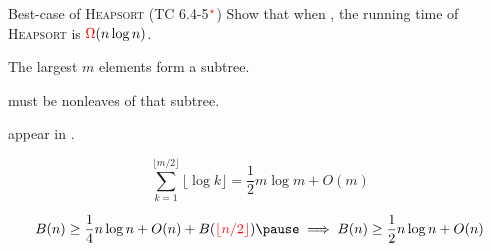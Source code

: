 \begin{frame}{}
  \begin{exampleblock}{Best-case of \textsc{Heapsort} (TC 6.4-5$\textcolor{red}{^{\star}}$)}
    Show that when , 
    the  running time of \textsc{Heapsort} is $\textcolor{red}{\Omega}(n \log n)$.
  \end{exampleblock}

  \pause
  \vspace{0.30cm}
  \begin{center}
    {}
  \end{center}

  \begin{center}
    The largest $m$ elements form a subtree. 
    \\[8pt] \pause

     must be nonleaves of that subtree. 
    \\[8pt] \pause

     appear in 
    . 
    \\[8pt] \pause

  \end{center}

  \pause
  \[
    \sum_{k=1}^{\lfloor m/2 \rfloor} \lfloor \log k \rfloor = \frac{1}{2} m \log m + O(m) 
  \]

  \pause
  \[
    B(n) \ge \frac{1}{4} n \log n + O(n) + B(\red{\lfloor n/2 \rfloor}) \pause \implies B(n) \ge \frac{1}{2} n \log n + O(n)
  \]
\end{frame}

